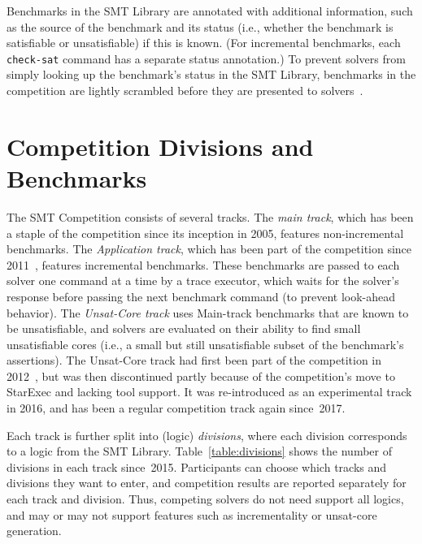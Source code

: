\documentclass[dvipsnames,table,twoside,11pt]{article}
\begin{document}
Benchmarks in the SMT Library are annotated with additional
information, such as the source of the benchmark and its status (i.e.,
whether the benchmark is satisfiable or unsatisfiable) if this is
known.  (For incremental benchmarks, each {\tt check-sat} command has
a separate status annotation.)  To prevent solvers from simply looking
up the benchmark's status in the SMT Library, benchmarks in the
competition are lightly scrambled before they are presented to
solvers~\cite{DBLP:conf/cade/Weber16}.


\section{Competition Divisions and Benchmarks}
\label{sec:benchmarks}

The SMT Competition consists of several tracks.  The \emph{main
  track}, which has been a staple of the competition since its
inception in 2005, features non-incremental benchmarks.  The
\emph{Application track}, which has been part of the competition since
2011~\cite{BDdMOS13}, features incremental benchmarks.  These
benchmarks are passed to each solver one command at a time by a trace
executor, which waits for the solver's response before passing the
next benchmark command (to prevent look-ahead behavior).  The
\emph{Unsat-Core track} uses Main-track benchmarks that are known to
be unsatisfiable, and solvers are evaluated on their ability to find
small unsatisfiable cores (i.e., a small but still unsatisfiable
subset of the benchmark's assertions).  The Unsat-Core track had first
been part of the competition in 2012~\cite{CGBD12}, but was then
discontinued partly because of the competition's move to StarExec and
lacking tool support.  It was re-introduced as an experimental track
in 2016, and has been a regular competition track again since~2017.

Each track is further split into (logic) \emph{divisions}, where each
division corresponds to a logic from the SMT Library.
Table~\ref{table:divisions} shows the number of divisions in each
track since~2015.  Participants can choose which tracks and divisions
they want to enter, and competition results are reported separately
for each track and division.  Thus, competing solvers do not need support
all logics, and may or may not support features such as incrementality
or unsat-core generation.
\end{document}

